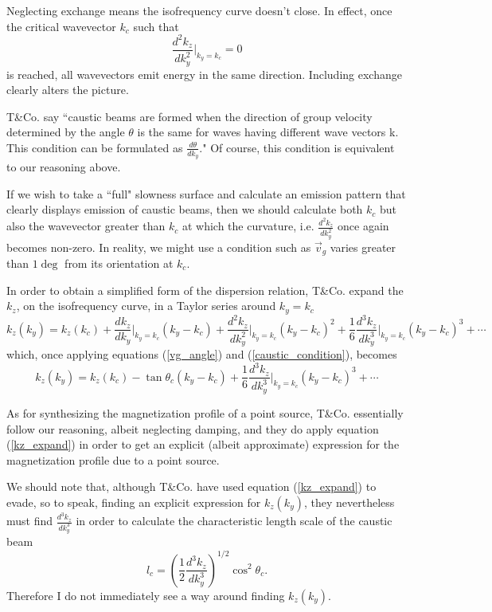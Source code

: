 \documentclass{article}
\begin{document}
Neglecting exchange means the isofrequency curve doesn't close. In effect, once the critical wavevector $k_{c}$ such that 
\begin{equation}\label{caustic_condition}
\frac{d^2 k_{z}}{d k_{y}^2} \bigg|_{k_{y} = k_{c}} = 0
\end{equation} 
is reached, all wavevectors emit energy in the same direction. Including exchange clearly alters the picture.

T\&{}Co. say ``caustic beams are formed when the direction of group velocity determined by the angle $\theta$ is the same for waves having different wave vectors k. This condition can be formulated as $\frac{d \theta}{d k_{y}}$." Of course, this condition is equivalent to our reasoning above.

If we wish to take a ``full" slowness surface and calculate an emission pattern that clearly displays emission of caustic beams, then we should calculate both $k_{c}$ but also the wavevector greater than $k_{c}$ at which the curvature, i.e. $\frac{d^2 k_{z}}{d k_{y}^2}$ once again becomes non-zero. In reality, we might use a condition such as $\vec{v}_{g}$ varies greater than $1 \deg$ from its orientation at $k_{c}$.

In order to obtain a simplified form of the dispersion relation, T\&{}Co. expand the $k_{z}$, on the isofrequency curve, in a Taylor series around $k_{y} = k_{c}$
\begin{equation}
k_{z} (k_{y} ) = k_{z} (k_{c}) + \frac{d k_{z}}{d k_{y}} \bigg|_{k_{y} = k_{c}} (k_{y} - k_{c}) + \frac{d^2 k_{z}}{d k_{y}^2} \bigg|_{k_{y} = k_{c}}(k_{y} - k_{c})^2 + \frac{1}{6} \frac{d^3 k_{z}}{d k_{y}^3} \bigg|_{k_{y} = k_{c}}(k_{y} - k_{c})^3 + \cdots
\end{equation}
which, once applying equations (\ref{vg_angle}) and (\ref{caustic_condition}), becomes
\begin{equation}\label{kz_expand}
k_{z} (k_{y} ) = k_{z} (k_{c}) - \tan{\theta_{c}} (k_{y} - k_{c}) + \frac{1}{6} \frac{d^3 k_{z}}{d k_{y}^3}\bigg|_{k_{y} = k_{c}} (k_{y} - k_{c})^3 + \cdots
\end{equation}

As for synthesizing the magnetization profile of a point source, T\&{}Co. essentially follow our reasoning, albeit neglecting damping, and they do apply equation (\ref{kz_expand}) in order to get an explicit (albeit approximate) expression for the magnetization profile due to a point source.

We should note that, although T\&{}Co. have used equation (\ref{kz_expand}) to evade, so to speak, finding an explicit expression for $k_{z} ( k_{y} )$, they nevertheless must find $\frac{d^3 k_{z}}{d k_{y}^3}$ in order to calculate the characteristic length scale of the caustic beam
\begin{equation}
l_{c} = \left( \frac{1}{2} \frac{d^3 k_{z}}{d k_{y}^3} \right)^{1/2} \cos^2{\theta_{c}}.
\end{equation}
Therefore I do not immediately see a way around finding $k_{z} (k_{y})$.
\end{document}
